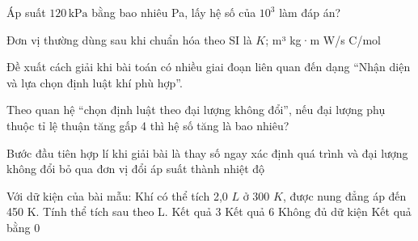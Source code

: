 \begin{ex}
Áp suất $120\,\text{kPa}$ bằng bao nhiêu Pa, lấy hệ số của $10^3$ làm đáp án?
\end{ex}

\begin{ex}
Đơn vị thường dùng sau khi chuẩn hóa theo SI là
\choice
{\True $K$; m³}
{kg·m}
{W/s}
{C/mol}
\end{ex}

\begin{ex}
Đề xuất cách giải khi bài toán có nhiều giai đoạn liên quan đến dạng “Nhận diện và lựa chọn định luật khí phù hợp”.
\choiceTF

\end{ex}

\begin{ex}
Theo quan hệ “chọn định luật theo đại lượng không đổi”, nếu đại lượng phụ thuộc tỉ lệ thuận tăng gấp 4 thì hệ số tăng là bao nhiêu?
\end{ex}

\begin{ex}
Bước đầu tiên hợp lí khi giải bài là
\choice
{thay số ngay}
{\True xác định quá trình và đại lượng không đổi}
{bỏ qua đơn vị}
{đổi áp suất thành nhiệt độ}
\end{ex}

\begin{ex}
Với dữ kiện của bài mẫu: Khí có thể tích 2,0 $L$ ở 300 $K$, được nung đẳng áp đến 450 K. Tính thể tích sau theo L.
\choice
{\True Kết quả 3}
{Kết quả 6}
{Không đủ dữ kiện}
{Kết quả bằng 0}
\end{ex}

